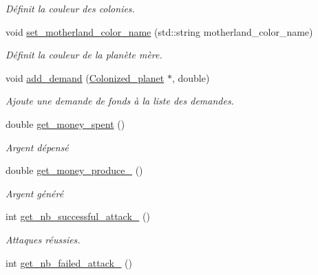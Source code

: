 \begin{DoxyCompactItemize}
\begin{DoxyCompactList}\small\item\em Définit la couleur des colonies. \end{DoxyCompactList}\item 
\hypertarget{classFaction_ab17a2eabec14355868177554502972c7}{void \hyperlink{classFaction_ab17a2eabec14355868177554502972c7}{set\-\_\-motherland\-\_\-color\-\_\-name} (std\-::string motherland\-\_\-color\-\_\-name)}\label{classFaction_ab17a2eabec14355868177554502972c7}

\begin{DoxyCompactList}\small\item\em Définit la couleur de la planète mère. \end{DoxyCompactList}\item 
void \hyperlink{classFaction_a8a61c34f87a1d1f1284aba39c4887595}{add\-\_\-demand} (\hyperlink{classColonized__planet}{Colonized\-\_\-planet} $\ast$, double)
\begin{DoxyCompactList}\small\item\em Ajoute une demande de fonds à la liste des demandes. \end{DoxyCompactList}\item 
\hypertarget{classFaction_ac9c04d847c334eb3b5dc8a8dbe61586d}{double \hyperlink{classFaction_ac9c04d847c334eb3b5dc8a8dbe61586d}{get\-\_\-money\-\_\-spent} ()}\label{classFaction_ac9c04d847c334eb3b5dc8a8dbe61586d}

\begin{DoxyCompactList}\small\item\em Argent dépensé \end{DoxyCompactList}\item 
\hypertarget{classFaction_ada676ea8a06f80c2710adf1243d48db2}{double \hyperlink{classFaction_ada676ea8a06f80c2710adf1243d48db2}{get\-\_\-money\-\_\-produce\-\_\-} ()}\label{classFaction_ada676ea8a06f80c2710adf1243d48db2}

\begin{DoxyCompactList}\small\item\em Argent généré \end{DoxyCompactList}\item 
\hypertarget{classFaction_a7b174edbce20f49b7331665cb589e2f3}{int \hyperlink{classFaction_a7b174edbce20f49b7331665cb589e2f3}{get\-\_\-nb\-\_\-successful\-\_\-attack\-\_\-} ()}\label{classFaction_a7b174edbce20f49b7331665cb589e2f3}

\begin{DoxyCompactList}\small\item\em Attaques réussies. \end{DoxyCompactList}\item 
\hypertarget{classFaction_a70bbfa3dc7d4bf441d98984814f9abd1}{int \hyperlink{classFaction_a70bbfa3dc7d4bf441d98984814f9abd1}{get\-\_\-nb\-\_\-failed\-\_\-attack\-\_\-} ()}\label{classFaction_a70bbfa3dc7d4bf441d98984814f9abd1}


\end{DoxyCompactItemize}
